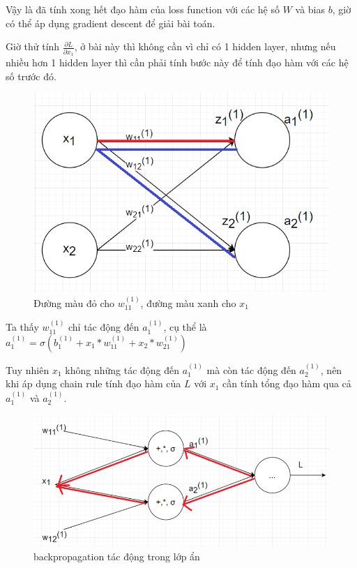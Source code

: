 Vậy là đã tính xong hết đạo hàm của loss function với các hệ số $W$ và bias $b$, giờ có thể áp dụng gradient descent để giải bài toán.

Giờ thử tính $ \frac{\partial L}{\partial x_1}$, ở bài này thì không cần vì chỉ có 1 hidden layer, nhưng nếu nhiều hơn 1 hidden layer thì cần phải tính bước này để tính đạo hàm với các hệ số trước đó.

\FloatBarrier
\begin{figure}[htp]
\begin{center}
\includegraphics[scale=0.75]{chap2/c2_figs/1.png}
\end{center}
\caption{Đường màu đỏ cho $w_{11}^{(1)}$, đường màu xanh cho $x_1$}
\label{fig:feed_forward}
\end{figure}
\FloatBarrier

Ta thấy $w_{11}^{(1)}$ chỉ tác động đến $a_1^{(1)}$, cụ thể là $ a_1^{(1)} = \sigma(b_1^{(1)} + x_1*w_{11}^{(1)} + x_2*w_{21}^{(1)})$ 

Tuy nhiên $x_1$ không những tác động đến $a_1^{(1)}$ mà còn tác động đến $a_2^{(1)}$, nên khi áp dụng chain rule tính đạo hàm của $L$ với $x_1$ cần tính tổng đạo hàm qua cả $a_1^{(1)}$ và $a_2^{(1)}$.

\FloatBarrier
\begin{figure}[htp]
\begin{center}
\includegraphics[scale=0.75]{chap2/c2_figs/2.png}
\end{center}
\caption{backpropagation tác động trong lớp ẩn}
\label{fig:feed_forward}
\end{figure}
\FloatBarrier

